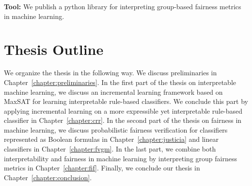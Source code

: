 \textbf{Tool:} We publish a python library \href{https://github.com/ReAILe/bias-explainer}{\fairXplainer} for interpreting group-based fairness metrics in machine learning.

\section{Thesis Outline}
We organize the thesis in the following way. We discuss preliminaries in Chapter~\ref{chapter:preliminaries}. In the first part of the thesis on interpretable machine learning, we discuss an incremental learning framework based on MaxSAT for learning interpretable rule-based classifiers. We conclude this part by applying incremental learning on a more expressible yet interpretable rule-based classifier in Chapter~\ref{chapter:crr}. In the second part of the thesis on fairness in machine learning, we discuss probabilistic fairness verification for classifiers represented as Boolean formulas in Chapter~\ref{chapter:justicia} and linear classifiers in Chapter~\ref{chapter:fvgm}.  In the last part, we combine both interpretability and fairness in machine learning by interpreting group fairness metrics in Chapter~\ref{chapter:fif}. Finally, we conclude our thesis in Chapter~\ref{chapter:conclusion}.


